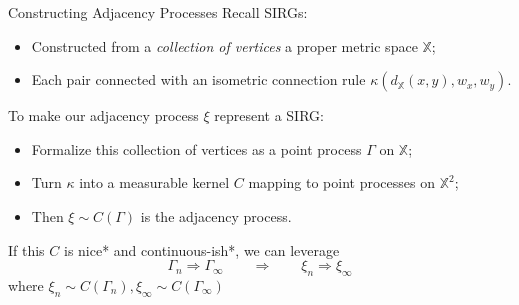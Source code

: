 \documentclass[aspectratio=169]{beamer}
\begin{document}
\begin{frame}{Constructing Adjacency Processes}
Recall SIRGs:
\begin{itemize}
    \item Constructed from a \textit{collection of vertices} a proper metric space $\mathbb{X}$;
    \item Each pair connected with an isometric connection rule $\kappa(d_\mathbb{X}(x,y), w_x, w_y)$. 
\end{itemize}

\pause 

\vspace{0.4em}

To make our adjacency process $\xi$ represent a SIRG:
\begin{itemize}
    \item Formalize this collection of vertices as a point process $\Gamma$ on $\mathbb{X}$;
    \item Turn $\kappa$ into a measurable kernel $C$ mapping to point processes on $\mathbb{X}^2$;
    \item Then $\xi \sim C(\Gamma)$ is the adjacency process.
\end{itemize}

\pause

\vspace{0.4em}

If this $C$ is nice* and continuous-ish*, we can leverage 
$$
    \Gamma_n \Rightarrow \Gamma_\infty \qquad \Longrightarrow \qquad \xi_n \Rightarrow \xi_\infty
$$
where $\xi_n \sim C(\Gamma_n), \xi_\infty \sim C(\Gamma_\infty)$

\end{frame}
\end{document}
